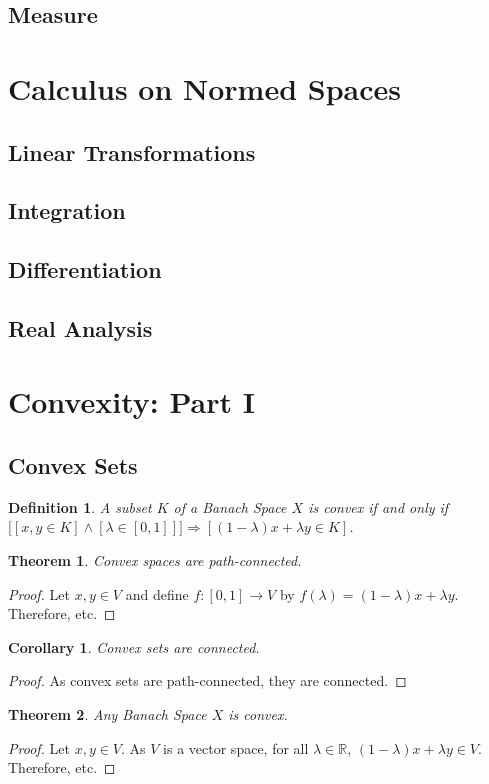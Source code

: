 \documentclass[oneside]{book}
\theoremstyle{mystyle}
\newtheorem{theorem}{Theorem}[section]
\newtheorem{definition}{Definition}[section]
\newtheorem{corollary}{Corollary}[section]
\begin{document}
\subsection{Measure}
%
\section{Calculus on Normed Spaces}
\subsection{Linear Transformations}
\subsection{Integration}
\subsection{Differentiation}
\subsection{Real Analysis}
\section{Convexity: Part I}
\subsection{Convex Sets}
\begin{definition}
A subset $K$ of a Banach Space $X$ is convex if and only if $\big[[x,y\in K]\land  [\lambda \in [0,1]]\big]\Rightarrow[(1-\lambda)x+\lambda y\in K]$.
\end{definition}
\begin{theorem}
Convex spaces are path-connected.
\end{theorem}
\begin{proof}
Let $x,y\in V$ and define $f:[0,1]\rightarrow V$ by $f(\lambda) = (1-\lambda)x+\lambda y$. Therefore, etc.
\end{proof}

\begin{corollary}
Convex sets are connected.
\end{corollary}
\begin{proof}
As convex sets are path-connected, they are connected.
\end{proof}

\begin{theorem}
Any Banach Space $X$ is convex.
\end{theorem}
\begin{proof}
Let $x,y\in V$. As $V$ is a vector space, for all $\lambda \in \mathbb{R}$, $(1-\lambda)x+\lambda y\in V$. Therefore, etc.
\end{proof}
\end{document}
